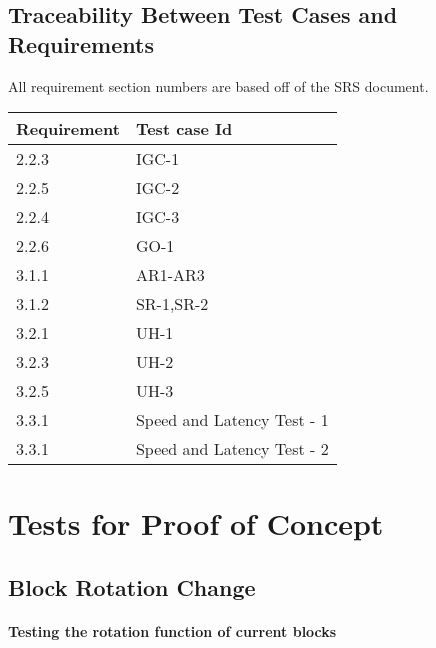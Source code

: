 \documentclass[12pt, titlepage]{article}
\begin{document}
\subsection{Traceability Between Test Cases and Requirements}
All requirement section numbers are based off of the SRS document.
\begin{center}
\begin{tabular}{ | m{7em} | m{12cm} | } 
\hline
Requirement & Test case Id\\ 
\hline
2.2.3 & IGC-1\\ 
\hline
2.2.5 & IGC-2\\ 
\hline
2.2.4 & IGC-3  \\ 
\hline
2.2.6 & GO-1\\ 
\hline
3.1.1 & AR1-AR3\\ 
\hline
3.1.2 & SR-1,SR-2\\ 
\hline
3.2.1 & UH-1\\ 
\hline
3.2.3 & UH-2\\ 
\hline
3.2.5 & UH-3\\ 
\hline
3.3.1 & Speed and Latency Test - 1\\ 
\hline
3.3.1 & Speed and Latency Test - 2\\ 
\hline
\end{tabular}
\end{center}


\section{Tests for Proof of Concept}

\subsection{Block Rotation Change}
		
\paragraph{Testing the rotation function of current blocks}
\end{document}
